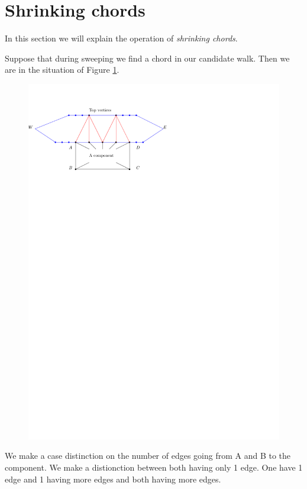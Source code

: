 
\section{Shrinking chords}
In this section we will explain the operation of \emph{shrinking chords}.


Suppose that during sweeping we find a chord  in our candidate walk. Then we are in the situation of Figure \ref{fig:chord:situation}.

\begin{figure}[h]
  \centering
  \includegraphics[scale=1]{chordShrink/img/situation}
  \caption{}
  \label{fig:chord:situation}
\end{figure}

We make a case distinction on the number of edges going from A and B to the component. We make a distionction between both having only 1 edge. One have 1 edge and 1 having more edges and both having more edges.



